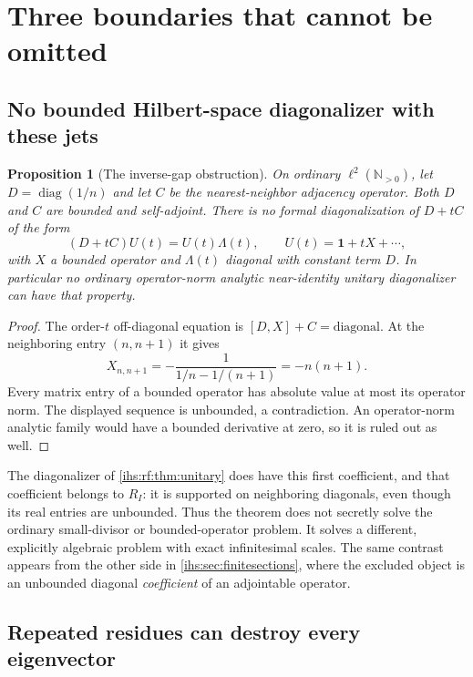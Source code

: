 \documentclass[11pt,a4paper]{article}
\numberwithin{equation}{section}
\newtheorem{proposition}[proposition]{Proposition}
\theoremstyle{definition}
\theoremstyle{remark}
\newcommand{\N}{\mathbb N}
\newcommand{\diag}{\operatorname{diag}}
\newcommand{\Id}{\mathbf 1}
\begin{document}
\section{Three boundaries that cannot be omitted}\label{ihs:sec:failures}

\subsection{No bounded Hilbert-space diagonalizer with these jets}\label{ihs:rf:sec:boundedfail}

\begin{proposition}[The inverse-gap obstruction]\label{ihs:rf:prop:bounded}
On ordinary $\ell^2(\N_{>0})$, let $D=\diag(1/n)$ and let $C$ be the
nearest-neighbor adjacency operator. Both $D$ and $C$ are bounded and
self-adjoint. There is no formal diagonalization of $D+tC$ of the form
\[
 (D+tC)U(t)=U(t)\Lambda(t),\qquad U(t)=\Id+tX+\cdots,
\]
with $X$ a bounded operator and $\Lambda(t)$ diagonal with constant term
$D$. In particular no ordinary operator-norm analytic near-identity unitary
diagonalizer can have that property.
\end{proposition}
\begin{proof}
The order-$t$ off-diagonal equation is $[D,X]+C=\text{diagonal}$. At the
neighboring entry $(n,n+1)$ it gives
\[
 X_{n,n+1}=-\frac1{1/n-1/(n+1)}=-n(n+1).
\]
Every matrix entry of a bounded operator has absolute value at most its
operator norm. The displayed sequence is unbounded, a contradiction. An
operator-norm analytic family would have a bounded derivative at zero, so it
is ruled out as well.
\end{proof}

The diagonalizer of \cref{ihs:rf:thm:unitary} does have this first
coefficient, and that coefficient belongs to $R_I$: it is supported on
neighboring diagonals, even though its real entries are unbounded. Thus the
theorem does not secretly solve the ordinary small-divisor or
bounded-operator problem. It solves a different, explicitly algebraic
problem with exact infinitesimal scales. The same contrast appears from the
other side in \cref{ihs:sec:finitesections}, where the excluded object is an
unbounded diagonal \emph{coefficient} of an adjointable operator.

\subsection{Repeated residues can destroy every eigenvector}\label{ihs:rf:sec:repeated}
\end{document}
